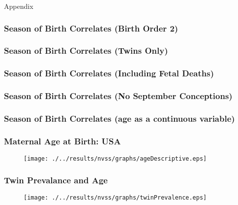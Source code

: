 \documentclass[10pt,letterpaper,subeqn]{beamer}
\begin{document}
\begin{frame}
\begin{center}
{\Large Appendix}
\end{center}
\end{frame}


\begin{frame}
\frametitle{Season of Birth Correlates (Birth Order 2)}

\end{frame}

\begin{frame}
\frametitle{Season of Birth Correlates (Twins Only)}

\end{frame}

\begin{frame}
\frametitle{Season of Birth Correlates (Including Fetal Deaths)}

\end{frame}

\begin{frame}
\frametitle{Season of Birth Correlates (No September Conceptions)}

\end{frame}





\begin{frame}%
\frametitle{Season of Birth Correlates (age as a continuous variable)}

\end{frame}


\begin{frame}[label=births]
\frametitle{Maternal Age at Birth: USA}
\begin{figure}[htpb!]
\begin{center}
  \centering
  \texttt{[image: ./../results/nvss/graphs/ageDescriptive.eps]}
  \label{fig:NVSSbirths}
\end{center}
\end{figure}
\vspace{-5mm}
\end{frame}

\begin{frame}[label=twins]
\frametitle{Twin Prevalance and Age}
\begin{figure}[htpb!]
\begin{center}
  \centering
  \texttt{[image: ./../results/nvss/graphs/twinPrevalence.eps]}
  \label{fig:NVSSTwins}
\end{center}
\end{figure}
\vspace{-5mm}
\end{frame}
\end{document}
